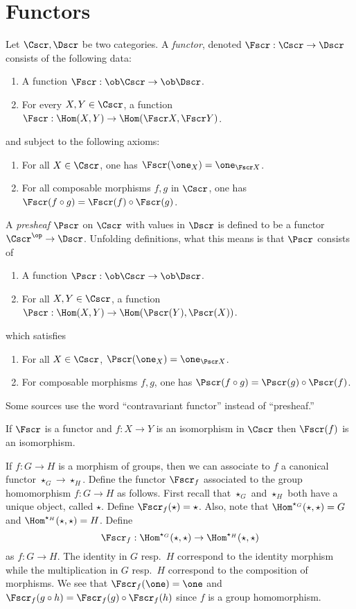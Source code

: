 \section{Functors}

Let $\Cscr, \Dscr$ be two categories.
A \emph{functor}, denoted $\Fscr : \Cscr \to \Dscr$ consists of the following data:
\begin{enumerate}
  \item A function $\Fscr : \ob \Cscr \to \ob \Dscr$.
  \item For every $X,Y \in \Cscr$, a function $\Fscr : \Hom(X,Y) \to \Hom(\Fscr X, \Fscr Y)$.
\end{enumerate}
and subject to the following axioms:
\begin{enumerate}
  \item For all $X \in \Cscr$, one has $\Fscr(\one_{X}) = \one_{\Fscr X}$.
  \item For all composable morphisms $f,g$ in $\Cscr$, one has $\Fscr(f \circ g) = \Fscr(f) \circ \Fscr(g)$.
\end{enumerate}

A \emph{presheaf} $\Pscr$ on $\Cscr$ with values in $\Dscr$ is defined to be a functor $\Cscr^{\op} \to \Dscr$.
Unfolding definitions, what this means is that $\Pscr$ consists of
\begin{enumerate}
  \item A function $\Pscr : \ob\Cscr \to \ob \Dscr$.
  \item For all $X,Y \in \Cscr$, a function $\Pscr : \Hom(X,Y) \to \Hom(\Pscr(Y),\Pscr(X))$.
\end{enumerate}
which satisfies
\begin{enumerate}
  \item For all $X \in \Cscr$, $\Pscr(\one_{X}) = \one_{\Pscr X}$.
  \item For composable morphisms $f,g$, one has $\Pscr(f \circ g) = \Pscr(g) \circ \Pscr(f)$.
\end{enumerate}
Some sources use the word ``contravariant functor'' instead of ``presheaf.''

\begin{exercise}
  If $\Fscr$ is a functor and $f : X \to Y$ is an isomorphism in $\Cscr$ then $\Fscr(f)$ is an isomorphism.
\end{exercise}

\begin{example}
  If $f : G \to H$ is a morphism of groups, then we can associate to $f$ a canonical functor $\star_{G} \to \star_{H}$.
  Define the functor $\Fscr_f$ associated to the group homomorphism $f : G \to H$ as follows.
  First recall that $\star_G$ and $\star_H$ both have a unique object, called $\star$.
  Define $\Fscr_f(\star) = \star$.
  Also, note that $\Hom^{\star_G}(\star,\star) = G$ and $\Hom^{\star_H}(\star,\star) = H$.
  Define
  \[ \Fscr_f : \Hom^{\star_G}(\star,\star) \to \Hom^{\star_H}(\star,\star) \] 
  as $f : G \to H$.
  The identity in $G$ resp.~$H$ correspond to the identity morphism while the multiplication in $G$ resp.~$H$ correspond to the composition of morphisms.
  We see that $\Fscr_f(\one) = \one$ and $\Fscr_f(g \circ h) = \Fscr_f(g) \circ \Fscr_f(h)$ since $f$ is a group homomorphism.
\end{example}

